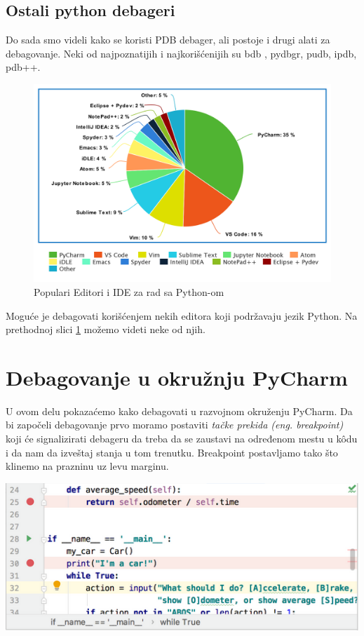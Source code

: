 \documentclass[a4paper]{article}
\begin{document}
\subsection{Ostali python debageri}
Do sada smo videli kako se koristi PDB debager, ali postoje i drugi alati za debagovanje. Neki od najpoznatijih i najkorišćenijih su bdb \cite{bdbDocPyt}, pydbgr, pudb, ipdb, pdb++.
\begin{figure}[h!]
\begin{center}
\includegraphics[scale=0.25]{pie.png}
\end{center}
\caption{Populari Editori i IDE za rad sa Python-om}
\label{fig:pie}
\end{figure}

Moguće je debagovati korišćenjem nekih editora koji podržavaju jezik Python. Na prethodnoj slici \ref{fig:pie} možemo videti neke od njih.

\section{Debagovanje u okružnju PyCharm}
U ovom delu pokazaćemo kako debagovati u razvojnom okruženju PyCharm. Da bi započeli debagovanje prvo moramo postaviti \emph{tačke prekida (eng. breakpoint)} koji će signalizirati debageru  da treba da se zaustavi na određenom mestu u k\^{o}du i da nam da izveštaj stanja u tom trenutku. Breakpoint postavljamo tako što klinemo na prazninu uz levu marginu.

\includegraphics[scale = 0.4]{1}
\end{document}
